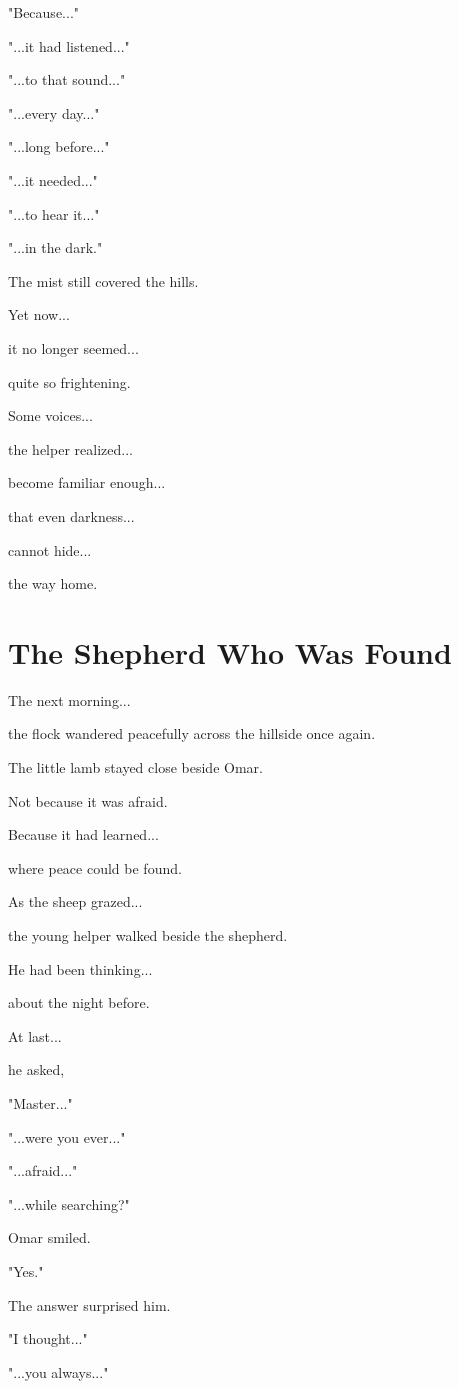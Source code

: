 \documentclass[12pt,openany]{book}
\begin{document}
"Because..."

"...it had listened..."

"...to that sound..."

"...every day..."

"...long before..."

"...it needed..."

"...to hear it..."

"...in the dark."

The mist still covered the hills.

Yet now...

it no longer seemed...

quite so frightening.

Some voices...

the helper realized...

become familiar enough...

that even darkness...

cannot hide...

the way home.
\section*{The Shepherd Who Was Found}

The next morning...

the flock wandered peacefully across the hillside once again.

The little lamb stayed close beside Omar.

Not because it was afraid.

Because it had learned...

where peace could be found.

As the sheep grazed...

the young helper walked beside the shepherd.

He had been thinking...

about the night before.

At last...

he asked,

"Master..."

"...were you ever..."

"...afraid..."

"...while searching?"

Omar smiled.

"Yes."

The answer surprised him.

"I thought..."

"...you always..."
\end{document}
